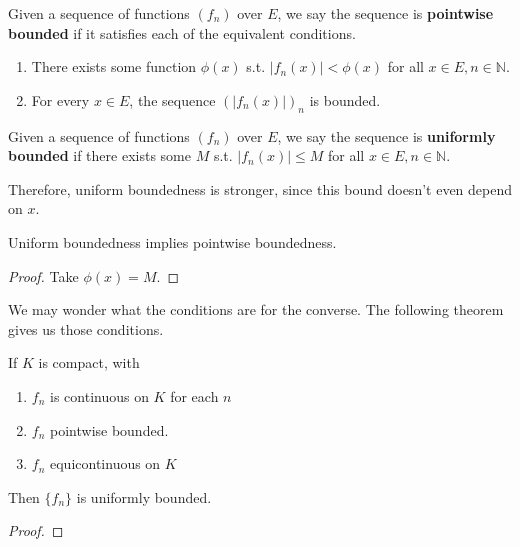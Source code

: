   \begin{definition}
    Given a sequence of functions $(f_n)$ over $E$, we say the sequence is \textbf{pointwise bounded} if it satisfies each of the equivalent conditions. 
    \begin{enumerate}
      \item There exists some function $\phi(x)$ s.t. $|f_n (x)| < \phi(x)$ for all $x \in E, n \in \mathbb{N}$. 
      \item For every $x \in E$, the sequence $(|f_n (x)|)_n$ is bounded. 
    \end{enumerate}
  \end{definition}

  \begin{definition}
    Given a sequence of functions $(f_n)$ over $E$, we say the sequence is \textbf{uniformly bounded} if there exists some $M$ s.t. $|f_n (x)| \leq M$ for all $x \in E, n \in \mathbb{N}$. 
  \end{definition}

  Therefore, uniform boundedness is stronger, since this bound doesn't even depend on $x$. 

  \begin{lemma}
    Uniform boundedness implies pointwise boundedness. 
  \end{lemma}
  \begin{proof}
    Take $\phi(x) = M$. 
  \end{proof}

  We may wonder what the conditions are for the converse. The following theorem gives us those conditions. 

  \begin{theorem}
    If $K$ is compact, with 
    \begin{enumerate}
      \item $f_n$ is continuous on $K$ for each $n$
      \item $f_n$ pointwise bounded. 
      \item $f_n$ equicontinuous on $K$
    \end{enumerate}
    Then $\{f_n\}$ is uniformly bounded. 
  \end{theorem}
  \begin{proof}
    
  \end{proof}

